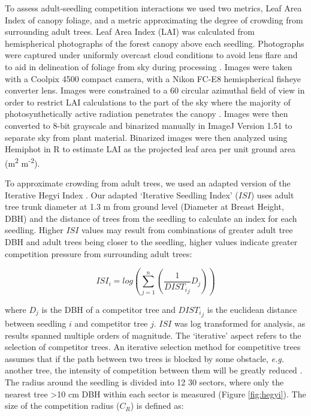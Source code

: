 \documentclass[a4paper, 11pt]{article}
\newcommand{\textapprox}{\raisebox{0.5ex}{\texttildelow}}
\begin{document}
To assess adult-seedling competition interactions we used two metrics, Leaf Area Index of canopy foliage, and a metric approximating the degree of crowding from surrounding adult trees. Leaf Area Index (LAI) was calculated from hemispherical photographs of the forest canopy above each seedling. Photographs were captured under uniformly overcast cloud conditions to avoid lens flare and to aid in delineation of foliage from sky during processing \citep{Frazer2001}. Images were taken with a Coolpix 4500 compact camera, with a Nikon FC-E8 hemispherical fisheye converter lens. Images were constrained to a 60\textdegree{} circular azimuthal field of view in order to restrict LAI calculations to the part of the sky where the majority of photosynthetically active radiation penetrates the canopy \citep{Jupp2009, Jonckheere2005}. Images were then converted to 8-bit grayscale and binarized manually in ImageJ Version 1.51 \citep{Schneider2012} to separate sky from plant material. Binarized images were then analyzed using Hemiphot \citep{hemiphot} in R to estimate LAI as the projected leaf area per unit ground area (m\textsuperscript{2} m\textsuperscript{-2}).

To approximate crowding from adult trees, we used an adapted version of the Iterative Hegyi Index \citep{Hegyi1974, Lee2004, Seifert2014}. Our adapted `Iterative Seedling Index' ($ISI$) uses adult tree trunk diameter at \textapprox{}1.3 m from ground level (Diameter at Breast Height, DBH) and the distance of trees from the seedling to calculate an index for each seedling. Higher $ISI$ values may result from combinations of  greater adult tree DBH and adult trees being closer to the seedling, higher values indicate greater competition pressure from surrounding adult trees:

\begin{equation}
\label{eq:ISI}
ISI_i = log(\sum_{j=1}^n (\frac{1}{{DIST_i}_j} D_j))
\end{equation}

where $D_j$ is the DBH of a competitor tree and ${{DIST_i}_j}$ is the euclidean distance between seedling $i$ and competitor tree $j$. $ISI$ was log transformed for analysis, as results spanned multiple orders of magnitude. The `iterative' aspect refers to the selection of competitor trees. An iterative selection method for competitive trees assumes that if the path between two trees is blocked by some obstacle, \textit{e.g.} another tree, the intensity of competition between them will be greatly reduced \citep{Gadow1999}. The radius around the seedling is divided into 12 30\textdegree{} sectors, where only the nearest tree \textgreater{}10 cm DBH within each sector is measured (Figure \ref{fig:hegyi}). The size of the competition radius ($C_R$) is defined as:
\end{document}
